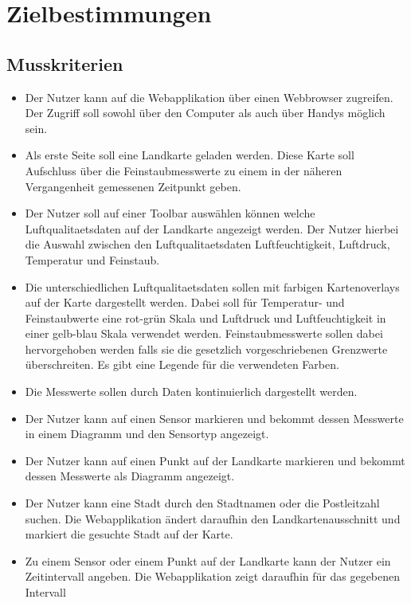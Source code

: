 \section{Zielbestimmungen}
\subsection{Musskriterien}
 \begin{itemize}
	\item Der Nutzer kann auf die Webapplikation über einen Webbrowser zugreifen. 
	Der Zugriff soll sowohl über den Computer als auch über Handys möglich sein.
	\item Als erste Seite soll eine Landkarte geladen werden.
	Diese Karte soll Aufschluss über die \gls{Feinstaub}messwerte zu einem in der näheren Vergangenheit gemessenen Zeitpunkt geben.
	\item Der Nutzer soll auf einer \gls{Toolbar} auswählen können welche \gls{Luftqualitaetsdaten} auf der Landkarte angezeigt werden. 
	Der Nutzer hierbei die Auswahl zwischen den \gls{Luftqualitaetsdaten} Luftfeuchtigkeit, Luftdruck, Temperatur und \gls{Feinstaub}.
	\item Die unterschiedlichen \gls{Luftqualitaetsdaten} sollen mit farbigen \glspl{Kartenoverlay} auf der Karte dargestellt werden. Dabei soll für Temperatur- und Feinstaubwerte eine rot-grün Skala und Luftdruck und Luftfeuchtigkeit in einer gelb-blau Skala verwendet werden. \gls{Feinstaub}messwerte sollen dabei hervorgehoben werden falls sie die gesetzlich vorgeschriebenen Grenzwerte überschreiten.
	Es gibt eine Legende für die verwendeten Farben. 
	\item Die Messwerte sollen durch  Daten kontinuierlich dargestellt werden.
	\item Der Nutzer kann auf einen \gls{Sensor} markieren und bekommt dessen Messwerte in einem Diagramm und den Sensortyp angezeigt.
	\item Der Nutzer kann auf einen Punkt auf der Landkarte markieren und bekommt dessen  Messwerte als Diagramm angezeigt.
	\item Der Nutzer kann eine Stadt durch den Stadtnamen oder die Postleitzahl suchen. 
	Die Webapplikation ändert daraufhin den Landkartenausschnitt und markiert die gesuchte Stadt auf der Karte.
	\item  Zu einem \gls{Sensor} oder einem Punkt auf der Landkarte kann der Nutzer ein Zeitintervall angeben. Die Webapplikation zeigt daraufhin für das gegebenen Intervall 

\end{itemize}
